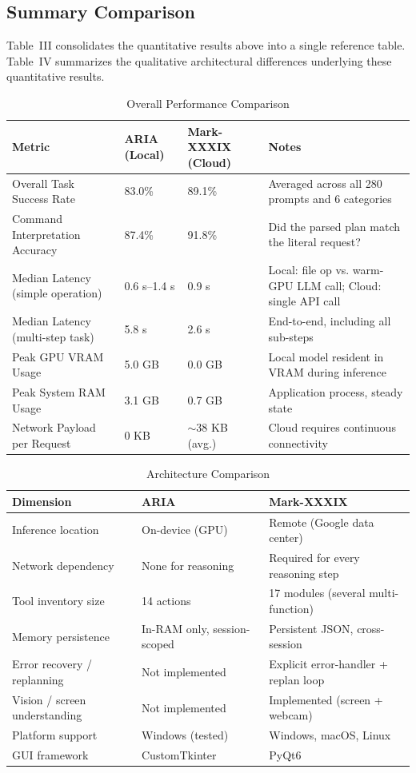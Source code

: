 \documentclass[conference]{IEEEtran}
\begin{document}
\subsection{Summary Comparison}

Table~III consolidates the quantitative results above into a single reference table. Table~IV summarizes the qualitative architectural differences underlying these quantitative results.

\begin{table}[htbp]
\caption{Overall Performance Comparison}
\label{tab:overall}
\centering
\begin{tabular}{p{4.2cm}p{2.2cm}p{2.4cm}p{6cm}}
\toprule
\textbf{Metric} & \textbf{ARIA (Local)} & \textbf{Mark-XXXIX (Cloud)} & \textbf{Notes} \\
\midrule
Overall Task Success Rate & 83.0\% & 89.1\% & Averaged across all 280 prompts and 6 categories \\
Command Interpretation Accuracy & 87.4\% & 91.8\% & Did the parsed plan match the literal request? \\
Median Latency (simple operation) & 0.6 s--1.4 s & 0.9 s & Local: file op vs. warm-GPU LLM call; Cloud: single API call \\
Median Latency (multi-step task) & 5.8 s & 2.6 s & End-to-end, including all sub-steps \\
Peak GPU VRAM Usage & 5.0 GB & 0.0 GB & Local model resident in VRAM during inference \\
Peak System RAM Usage & 3.1 GB & 0.7 GB & Application process, steady state \\
Network Payload per Request & 0 KB & $\sim$38 KB (avg.) & Cloud requires continuous connectivity \\
\bottomrule
\end{tabular}
\end{table}

\begin{table}[htbp]
\caption{Architecture Comparison}
\label{tab:archcomp}
\centering
\begin{tabular}{p{3.5cm}p{6cm}p{6.5cm}}
\toprule
\textbf{Dimension} & \textbf{ARIA} & \textbf{Mark-XXXIX} \\
\midrule
Inference location & On-device (GPU) & Remote (Google data center) \\
Network dependency & None for reasoning & Required for every reasoning step \\
Tool inventory size & 14 actions & 17 modules (several multi-function) \\
Memory persistence & In-RAM only, session-scoped & Persistent JSON, cross-session \\
Error recovery / replanning & Not implemented & Explicit error-handler + replan loop \\
Vision / screen understanding & Not implemented & Implemented (screen + webcam) \\
Platform support & Windows (tested) & Windows, macOS, Linux \\
GUI framework & CustomTkinter & PyQt6 \\
\bottomrule
\end{tabular}
\end{table}
\end{document}
